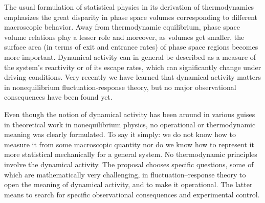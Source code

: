 The usual formulation of statistical physics in its derivation of thermodynamics emphasizes the great disparity in phase space volumes corresponding to different macroscopic behavior. Away from thermodynamic equilibrium, phase space volume relations play a lesser role and moreover, as volumes get smaller, the surface area (in terms of exit and entrance rates) of phase space regions becomes more important.
Dynamical activity can in general be described as a measure of the system’s reactivity or of its escape rates, which can significantly change under driving conditions. Very recently we have learned that dynamical activity matters in nonequilibrium fluctuation-response theory, but no major observational consequences have been found yet.

Even though the notion of dynamical activity has been around in various guises in theoretical work in nonequilibrium physics, no operational or thermodynamic meaning was clearly formulated. To say it simply: we do not know how to measure it from some macroscopic quantity nor do we know how to represent it more statistical mechanically for a general system. No thermodynamic principles involve the dynamical activity.  The proposal chooses specific questions, some of which are mathematically very challenging, in fluctuation–response theory to open the meaning of dynamical activity, and to make it operational. The latter means to search for specific observational consequences and experimental control.\\

